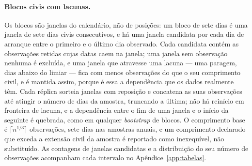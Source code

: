 \paragraph{Blocos civis com lacunas.} Os blocos são janelas do calendário,
não de posições: um bloco de sete dias é uma janela de sete dias civis
consecutivos, e há uma janela candidata por cada dia de arranque entre o
primeiro e o último dia observado. Cada candidata contém as observações
retidas cujas datas caem na janela; uma janela sem observação nenhuma é
excluída, e uma janela que atravesse uma lacuna --- uma paragem, dias abaixo
do limiar --- fica com menos observações do que o seu comprimento civil, e é
mantida assim, porque é essa a dependência que os dados realmente têm. Cada
réplica sorteia janelas com reposição e concatena as suas observações até
atingir o número de dias da amostra, truncando a última; não há reinício
em fronteira de lacuna, e a dependência entre o fim de uma janela e o início
da seguinte é quebrada, como em qualquer \emph{bootstrap} de blocos. O
comprimento base é $\lceil n^{1/3}\rceil$ observações, sete dias nas amostras
anuais, e um comprimento declarado que exceda a extensão civil da amostra é
reportado como inexequível, não substituído. As contagens de janelas
candidatas e a distribuição do seu número de observações acompanham cada
intervalo no Apêndice~\ref{app:tabelas}.

